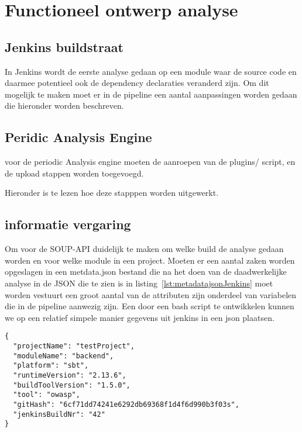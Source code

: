 \chapter{Functioneel ontwerp analyse}\label{ch:impl-Jenkins}


\section{Jenkins buildstraat}\label{sec:jenkins-buildtstraat}
In Jenkins wordt de eerste analyse gedaan op een module waar de source code en daarmee potentieel ook de dependency declaraties veranderd zijn.
Om dit mogelijk te maken moet er in de pipeline een aantal aanpassingen worden gedaan die hieronder worden beschreven.

\section{Peridic Analysis Engine}\label{sec:pae-builstraat}
voor de periodic Analysis engine moeten de aanroepen van de plugins/ script, en de upload stappen worden toegevoegd.

Hieronder is te lezen hoe deze stapppen worden uitgewerkt.

\section{informatie vergaring}\label{sec:informatie-vergaring}
Om voor de SOUP-API duidelijk te maken om welke build de analyse gedaan worden en voor welke module in een project. Moeten er een aantal zaken worden opgeslagen in een metdata.json bestand die na het doen van de daadwerkelijke analyse in de JSON die te zien is in listing~\ref{lst:metadatajsonJenkins} moet worden vestuurt een groot aantal van de attributen zijn onderdeel van variabelen die in de pipeline aanwezig zijn.
Een door een bash script te ontwikkelen kunnen we op een relatief simpele manier gegevens uit jenkins in een json plaatsen.

\begin{lstlisting}[caption={metadata JSon object behorende bij de case class}, label={lst:metadatajsonJenkins}]
{
  "projectName": "testProject",
  "moduleName": "backend",
  "platform": "sbt",
  "runtimeVersion": "2.13.6",
  "buildToolVersion": "1.5.0",
  "tool": "owasp",
  "gitHash": "6cf71dd74241e6292db69368f1d4f6d990b3f03s",
  "jenkinsBuildNr": "42"
}
\end{lstlisting}


